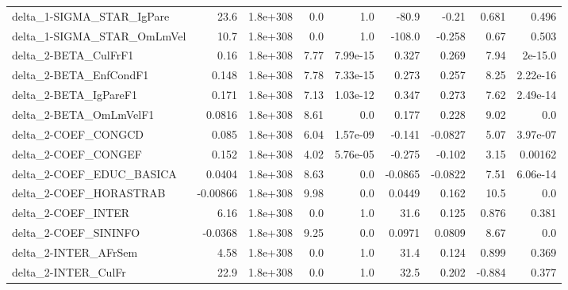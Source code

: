 \begin{tabular}{lrrrrrrrr}
delta\_1-SIGMA\_STAR\_IgPare             &        23.6 &     1.8e+308 &     0.0 &      1.0 &      -80.9 &       -0.21 &        0.681 &         0.496 \\
delta\_1-SIGMA\_STAR\_OmLmVel            &        10.7 &     1.8e+308 &     0.0 &      1.0 &     -108.0 &      -0.258 &         0.67 &         0.503 \\
delta\_2-BETA\_CulFrF1                  &        0.16 &     1.8e+308 &    7.77 & 7.99e-15 &      0.327 &       0.269 &         7.94 &       2e-15.0 \\
delta\_2-BETA\_EnfCondF1                &       0.148 &     1.8e+308 &    7.78 & 7.33e-15 &      0.273 &       0.257 &         8.25 &      2.22e-16 \\
delta\_2-BETA\_IgPareF1                 &       0.171 &     1.8e+308 &    7.13 & 1.03e-12 &      0.347 &       0.273 &         7.62 &      2.49e-14 \\
delta\_2-BETA\_OmLmVelF1                &      0.0816 &     1.8e+308 &    8.61 &      0.0 &      0.177 &       0.228 &         9.02 &           0.0 \\
delta\_2-COEF\_CONGCD                   &       0.085 &     1.8e+308 &    6.04 & 1.57e-09 &     -0.141 &     -0.0827 &         5.07 &      3.97e-07 \\
delta\_2-COEF\_CONGEF                   &       0.152 &     1.8e+308 &    4.02 & 5.76e-05 &     -0.275 &      -0.102 &         3.15 &       0.00162 \\
delta\_2-COEF\_EDUC\_BASICA              &      0.0404 &     1.8e+308 &    8.63 &      0.0 &    -0.0865 &     -0.0822 &         7.51 &      6.06e-14 \\
delta\_2-COEF\_HORASTRAB                &    -0.00866 &     1.8e+308 &    9.98 &      0.0 &     0.0449 &       0.162 &         10.5 &           0.0 \\
delta\_2-COEF\_INTER                    &        6.16 &     1.8e+308 &     0.0 &      1.0 &       31.6 &       0.125 &        0.876 &         0.381 \\
delta\_2-COEF\_SININFO                  &     -0.0368 &     1.8e+308 &    9.25 &      0.0 &     0.0971 &      0.0809 &         8.67 &           0.0 \\
delta\_2-INTER\_AFrSem                  &        4.58 &     1.8e+308 &     0.0 &      1.0 &       31.4 &       0.124 &        0.899 &         0.369 \\
delta\_2-INTER\_CulFr                   &        22.9 &     1.8e+308 &     0.0 &      1.0 &       32.5 &       0.202 &       -0.884 &         0.377 \\

\end{tabular}
